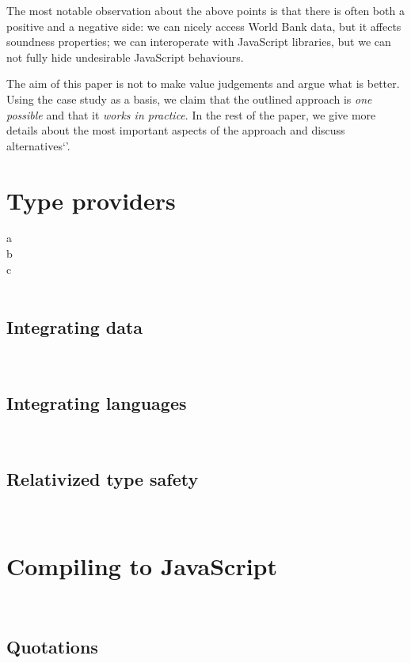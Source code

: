 \documentclass[submission,copyright,creativecommons]{eptcs}
\begin{document}
\noindent
The most notable observation about the above points is that there is often both a positive and
a negative side: we can nicely access World Bank data, but it affects soundness properties;
we can interoperate with JavaScript libraries, but we can not fully hide undesirable JavaScript 
behaviours.

The aim of this paper is not to make value judgements and argue what is better. Using the case
study as a basis, we claim that the outlined approach is \emph{one possible} and that it
\emph{works in practice}. In the rest of the paper, we give more details about the most important 
aspects of the approach and discuss alternatives`'.


\section{Type providers}
\label{sec:tp}
a \\
b \\
c \\
~

\subsection{Integrating data}
\label{sec:tp-data}

~

\subsection{Integrating languages}
\label{sec:tp-lang}

~

\subsection{Relativized type safety}
\label{sec:tp-relative}

~


\section{Compiling to JavaScript}
\label{sec:js}

~

\subsection{Quotations}
\label{sec:js-meta}
\end{document}

